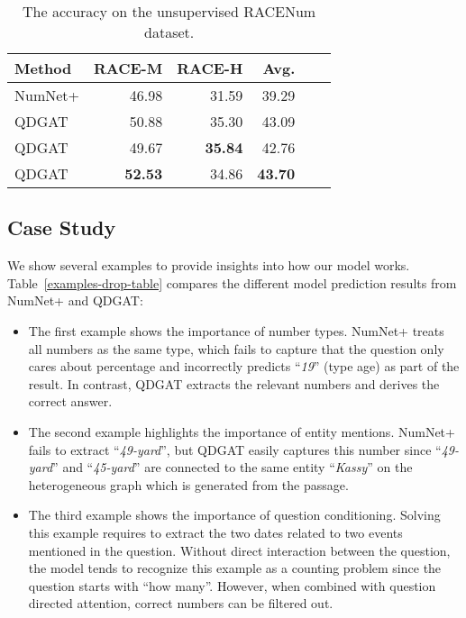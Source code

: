 \documentclass{article}
\begin{document}
\begin{table} 
\caption{The accuracy on the unsupervised RACENum dataset.}
\label{race-results-race-table}
\vskip 0.15in
\begin{center}
\begin{small}
\begin{tabularx}{\linewidth}{lRRRRr}
\toprule
Method & RACE-M & RACE-H  & Avg. \\
\midrule
NumNet+ & 46.98 & 31.59 & 39.29  \\
QDGAT  & 50.88 & 35.30 & 43.09 \\
QDGAT & 49.67 & \textbf{35.84} & 42.76 \\
QDGAT & \textbf{52.53} & 34.86 & \textbf{43.70} \\
\bottomrule
\end{tabularx}
\end{small}
\end{center}
\vskip -0.1in
\end{table}




\subsection{Case Study}
We show several examples to provide insights into how our model works. Table~\ref{examples-drop-table} compares the different model prediction results from NumNet+ and QDGAT:
\begin{itemize}\setlength\itemsep{0.5em}
\item The first example shows the importance of number types. NumNet+ treats all numbers as the same type, which fails to capture that the question only cares about percentage and incorrectly predicts ``\textit{19}'' (type age) as part of the result. In contrast, QDGAT extracts the relevant numbers and derives the correct answer.
\item The second example highlights the importance of entity mentions. NumNet+ fails to extract ``\textit{49-yard}'', but QDGAT easily captures this number since ``\textit{49-yard}'' and ``\textit{45-yard}'' are connected to the same entity ``\textit{Kassy}'' on the heterogeneous graph which is generated from the passage.
\item The third example shows the importance of question conditioning. 
Solving this example requires to extract the two dates related to two events mentioned in the question.
Without direct interaction between the question, the model tends to recognize this example as a counting problem since the question starts with ``how many''.
However, when combined with question directed attention, correct numbers can be filtered out.
\end{itemize}
\end{document}
